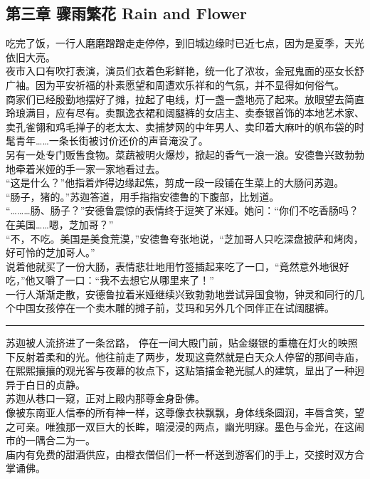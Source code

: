 \documentclass[oneside,11pt]{memoir} %
\begin{document}
\begin{CJK}{UTF8}{gbsn}
\chapter*{第三章    骤雨繁花    Rain and Flower}
   吃完了饭，一行人磨磨蹭蹭走走停停，到旧城边缘时已近七点，因为是夏季，天光依旧大亮。\\\indent
    夜市入口有吹打表演，演员们衣着色彩鲜艳，统一化了浓妆，金冠鬼面的巫女长舒广袖。因为平安祈福的朴素愿望和周遭欢乐祥和的气氛，并不显得如何俗气。\\\indent
    商家们已经殷勤地摆好了摊，拉起了电线，灯一盏一盏地亮了起来。放眼望去简直玲琅满目，应有尽有。卖飘逸衣裙和阔腿裤的女店主、卖泰银首饰的本地艺术家、卖孔雀翎和鸡毛掸子的老太太、卖捕梦网的中年男人、卖印着大麻叶的帆布袋的时髦青年……一条长街被讨价还价的声音淹没了。\\\indent
    另有一处专门贩售食物。菜蔬被明火爆炒，掀起的香气一浪一浪。安德鲁兴致勃勃地牵着米娅的手一家一家地看过去。\\\indent
    “这是什么？”他指着炸得边缘起焦，剪成一段一段铺在生菜上的大肠问苏迦。\\\indent
    “肠子，猪的。”苏迦答道，用手指指安德鲁的下腹部，比划道。\\\indent
    “………肠、肠子？”安德鲁震惊的表情终于逗笑了米娅。她问：“你们不吃香肠吗？在美国……嗯，芝加哥？”\\\indent
    “不，不吃。美国是美食荒漠，”安德鲁夸张地说，“芝加哥人只吃深盘披萨和烤肉，好可怜的芝加哥人。”\\\indent
    说着他就买了一份大肠，表情悲壮地用竹签插起来吃了一口，“竟然意外地很好吃，”他又嚼了一口：“我不去想它从哪里来了！”\\\indent
    一行人渐渐走散，安德鲁拉着米娅继续兴致勃勃地尝试异国食物，钟灵和同行的几个中国女孩停在一个卖木雕的摊子前，艾玛和另外几个同伴正在试阔腿裤。\\\indent
  \rule{-3pt}{30pt}
    苏迦被人流挤进了一条岔路， 停在一间大殿门前，贴金缀银的重檐在灯火的映照下反射着柔和的光。他往前走了两步，发现这竟然就是白天众人停留的那间寺庙，在熙熙攘攘的观光客与夜幕的妆点下，这贴箔描金艳光腻人的建筑，显出了一种迥异于白日的贞静。\\\indent
    苏迦从巷口一窥，正对上殿内那尊金身卧佛。\\\indent
    像被东南亚人信奉的所有神一样，这尊像衣袂飘飘，身体线条圆润，丰唇含笑，望之可亲。唯独那一双巨大的长眸，暗浸浸的两点，幽光明寐。墨色与金光，在这闹市的一隅合二为一。\\\indent
    庙内有免费的甜酒供应，由橙衣僧侣们一杯一杯送到游客们的手上，交接时双方合掌诵佛。\\\indent

\end{CJK}
\end{document}
